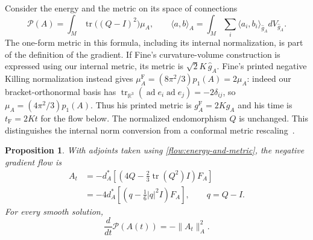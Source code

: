 \documentclass[11pt]{article}
\numberwithin{equation}{section}
\newtheorem{proposition}[theorem]{Proposition}
\theoremstyle{definition}
\theoremstyle{remark}
\begin{document}
Consider the energy and the metric on its space of connections
\begin{equation}
 \mathcal P(A)=\int_M\operatorname{tr}\bigl((Q-I)^2\bigr)\mu_A,
 \qquad
 \langle a,b\rangle_A=
 \int_M\sum_i\langle a_i,b_i\rangle_{\widehat g_A}
          dV_{\widehat g_A}.
 \label{flow:energy-and-metric}
\end{equation}
The one-form metric in this formula, including its internal normalization,
is part of the definition of the gradient. If Fine's curvature-volume
construction is expressed using our internal metric, its metric is
$\sqrt2K\,\widehat g_A$. Fine's printed negative Killing normalization
instead gives $\mu_A^{\mathrm F}=(8\pi^2/3)p_1(A)=2\mu_A$:
indeed our bracket-orthonormal basis has
$\operatorname{tr}_{\mathbb R^3}(\operatorname{ad}e_i\operatorname{ad}e_j)
=-2\delta_{ij}$, so $\mu_A=(4\pi^2/3)p_1(A)$.
Thus his printed metric is $g_A^{\mathrm F}=2K\widehat g_A$ and
his time is $t_{\mathrm F}=2Kt$ for the flow below. The normalized
endomorphism $Q$ is unchanged. This distinguishes the internal norm
conversion from a conformal metric rescaling~\cite{Fine2011}.

\begin{proposition}
\label{flow:gradient}
With adjoints taken using \eqref{flow:energy-and-metric}, the negative
gradient flow is
\begin{align}
 A_t&=-d_A^*\left[
      \left(4Q-\frac23\operatorname{tr}(Q^2)I\right)F_A\right]
       \label{flow:gradient-equation}\\
    &=-4d_A^*\left[
      \left(q-\frac16\lvert q\rvert^2I\right)F_A\right],
       \qquad q=Q-I.\nonumber
\end{align}
For every smooth solution,
\begin{equation}
 \frac{d}{dt}\mathcal P(A(t))=-\lVert A_t\rVert_A^2.
 \label{flow:energy-dissipation}
\end{equation}
\end{proposition}
\end{document}

